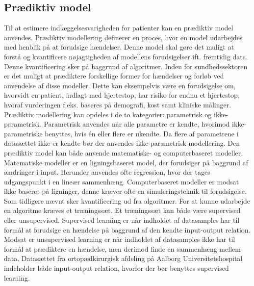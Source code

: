 \subsection{Prædiktiv model}
\noindent
Til at estimere indlæggelsesvarigheden for patienter kan en prædiktiv model anvendes.
Prædiktiv modellering definerer en proces, hvor en model udarbejdes med henblik på at forudsige hændelser. Denne model skal gøre det muligt at forstå og kvantificere nøjagtigheden af modellens forudsigelser ift. fremtidig data.\cite{Kuhn2013} Denne kvantificering sker på baggrund af algoritmer. 
Inden for sundhedssektoren er det muligt at prædiktere forskellige former for hændelser og forløb ved anvendelse af disse modeller. Dette kan eksempelvis være en forudsigelse om, hvorvidt en patient, indlagt med hjertestop, har risiko for endnu et hjertestop, hvoraf vurderingen f.eks. baseres på demografi, kost samt kliniske målinger\cite{Hastie2008}. 
Prædiktiv modellering kan opdeles i de to kategorier: parametrisk og ikke-parametrisk. Parametrisk anvendes når alle parametre er kendte, hvorimod ikke-parametriske benyttes, hvis én eller flere er ukendte. Da flere af parametrene i datasættet ikke er kendte bør der anvendes ikke-parametrisk modellering.\cite{Sheskin2000}
Den prædiktiv model kan både anvende matematiske- og computerbaseret modeller. Matematiske modeller er en ligningsbaseret model, der forudsiger på baggrund af ændringer i input. Herunder anvendes ofte regression, hvor der tages udgangspunkt i en lineær sammenhæng. Computerbaseret modeller er modsat ikke baseret på ligninger, denne kræver ofte en simuleringsteknik til forudsigelse.\cite{MathWorks2016}
Som tidligere nævnt sker kvantificering ud fra algoritmer. For at kunne udarbejde en algoritme kræves et træningssæt\cite{DIKU2010}. Et træningssæt kan både være supervised eller unsupervised. Supervised learning er når indholdet af datasamples har til formål at forudsige en hændelse på baggrund af den kendte input-output relation\cite{Brownlee2013}. Modsat er unsupervised learning er når indholdet af datasamples ikke har til formål at prædiktere en hændelse, men derimod finde en sammenhæng mellem data\cite{Brownlee2013, Kuhn2013}. Datasættet fra ortopædkirurgisk afdeling på Aalborg Universitetshospital indeholder både input-output relation, hvorfor der bør benyttes supervised learning. 

